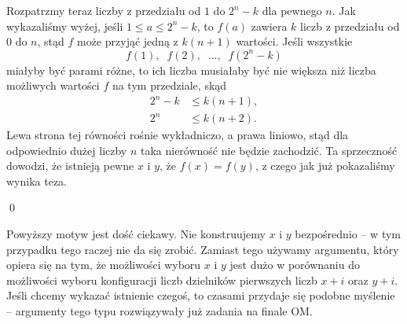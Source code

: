 \noindent
Rozpatrzmy teraz liczby z przedziału od $1$ do $2^n - k$ dla pewnego $n$. Jak wykazaliśmy wyżej, jeśli $1 \leqslant a \leqslant 2^n - k$, to $f(a)$ zawiera $k$ liczb z przedziału od $0$ do $n$, stąd $f$ może przyjąć jedną z $k(n + 1)$ wartości. Jeśli wszystkie 
\[
	f(1), \;\; f(2), \;\; ..., \;\; f(2^n - k)
\]
miałyby być parami różne, to ich liczba musiałaby być nie większa niż liczba możliwych wartości $f$ na tym przedziale, skąd
\begin{align*}
	2^n - k &\leqslant k(n + 1), \\
	2^n &\leqslant k(n + 2).
\end{align*}
Lewa strona tej równości rośnie wykładniczo, a prawa liniowo, stąd dla odpowiednio dużej liczby $n$ taka nierówność nie będzie zachodzić. Ta sprzeczność dowodzi, że istnieją pewne $x$ i $y$, że $f(x) = f(y)$, z czego jak już pokazaliśmy wynika teza.

\qed

\noindent
Powyższy motyw jest dość ciekawy. Nie konstruujemy $x$ i $y$ bezpośrednio -- w tym przypadku tego raczej nie da się zrobić. Zamiast tego używamy argumentu, który opiera się na tym, że możliwości wyboru $x$ i $y$ jest dużo w porównaniu do możliwości wyboru konfiguracji liczb dzielników pierwszych liczb $x + i$ oraz $y + i$. Jeśli chcemy wykazać istnienie czegoś, to czasami przydaje się podobne myślenie -- argumenty tego typu rozwiązywały już zadania na finale OM.
\vspace{10px} 
